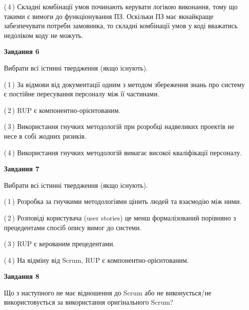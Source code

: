 \documentclass[10pt, ukrainian]{article}
\begin{document}
{\begin {large}
(\,4\,) Складні комбінації умов починають керувати логікою виконання, тому що такими є вимоги до функціонування ПЗ. Оскільки ПЗ має якнайкраще забезпечувати потреби замовника, то складні комбінації умов у коді вважатись недоліком коду не можуть. %

\newpage

{\begin {center}\textbf{Завдання 6}\end {center}}\par
Вибрати всі істинні твердження (якщо існують).\par
\vspace{2mm}



(\,1\,) За відмови від документації одним з методом збереження знань про систему є постійне пересування персоналу між її частинами. %



(\,2\,) RUP є компонентно-орієнтованим. %



(\,3\,) Використання гнучких методологій при розробці надвеликих проектів не несе в собі жодних ризиків. %



(\,4\,) Використання гнучких методологій вимагає високої кваліфікації персоналу. %


{\begin {center}\textbf{Завдання 7}\end {center}}\par
Вибрати всі істинні твердження (якщо існують).\par
\vspace{2mm}



(\,1\,) Розробка за гнучкими методологіями цінить людей та взаємодію між ними. %



(\,2\,) Розповіді користувача (user stories) це менш формалізований порівняно з прецедентами спосіб опису вимог до системи. %



(\,3\,) RUP є керованим прецедентами. %



(\,4\,) На відміну від Scrum, RUP є компонентно-орієнтованим. %


{\begin {center}\textbf{Завдання 8}\end {center}}\par
Що з наступного не має відношення до Scrum або не виконується/не використовується за використання оригінального Scrum?\par
\vspace{2mm}




\end{large}}
\end{document}
